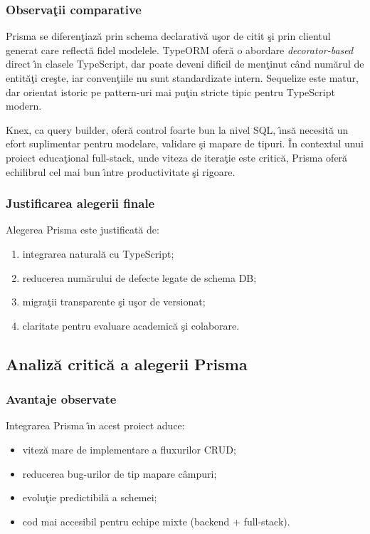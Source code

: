 \documentclass[12pt,onecolumn,draftclsnofoot]{IEEEtran}
\begin{document}
\subsubsection{Observa\c{t}ii comparative}
Prisma se diferen\c{t}iaz\u{a} prin schema declarativ\u{a} u\c{s}or de citit \c{s}i prin clientul generat care reflect\u{a} fidel modelele. TypeORM ofer\u{a} o abordare \emph{decorator-based} direct \^{\i}n clasele TypeScript, dar poate deveni dificil de men\c{t}inut c\^{a}nd num\u{a}rul de entit\u{a}\c{t}i cre\c{s}te, iar conven\c{t}iile nu sunt standardizate intern. Sequelize este matur, dar orientat istoric pe pattern-uri mai pu\c{t}in stricte tipic pentru TypeScript modern.

Knex, ca query builder, ofer\u{a} control foarte bun la nivel SQL, \^{\i}ns\u{a} necesit\u{a} un efort suplimentar pentru modelare, validare \c{s}i mapare de tipuri. \^{I}n contextul unui proiect educa\c{t}ional full-stack, unde viteza de itera\c{t}ie este critic\u{a}, Prisma ofer\u{a} echilibrul cel mai bun \^{\i}ntre productivitate \c{s}i rigoare.

\subsubsection{Justificarea alegerii finale}
Alegerea Prisma este justificat\u{a} de:
\begin{enumerate}[label=\arabic*)]
  \item integrarea natural\u{a} cu TypeScript;
  \item reducerea num\u{a}rului de defecte legate de schema DB;
  \item migra\c{t}ii transparente \c{s}i u\c{s}or de versionat;
  \item claritate pentru evaluare academic\u{a} \c{s}i colaborare.
\end{enumerate}

\subsection{Analiz\u{a} critic\u{a} a alegerii Prisma}
\subsubsection{Avantaje observate}
Integrarea Prisma \^{\i}n acest proiect aduce:
\begin{itemize}
  \item vitez\u{a} mare de implementare a fluxurilor CRUD;
  \item reducerea bug-urilor de tip mapare c\^{a}mpuri;
  \item evolu\c{t}ie predictibil\u{a} a schemei;
  \item cod mai accesibil pentru echipe mixte (backend + full-stack).
\end{itemize}
\end{document}
